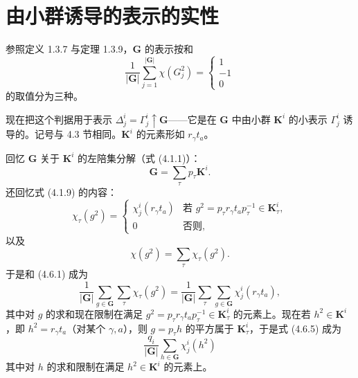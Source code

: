 \section{由小群诱导的表示的实性}

参照定义 1.3.7 与定理 1.3.9，$\mathbf{G}$ 的表示按和
\begin{equation*}
\frac{1}{|\mathbf{G}|}\sum^{|\mathbf{G}|}_{j=1}\chi(G^{2}_{j}) =
\left\{
\begin{array}{c}
1\\
-1\\
0
\end{array}
\right.
\tag{4.6.1}
\end{equation*}
的取值分为三种。

现在把这个判据用于表示 $\Delta^{i}_{j} = \Gamma^{i}_{j} \uparrow \mathbf{G}$——它是在 $\mathbf{G}$ 中由小群 $\mathbf{K}^{i}$ 的小表示 $\Gamma^{i}_{j}$ 诱导的。记号与 4.3 节相同。$\mathbf{K}^{i}$ 的元素形如 $r_{\gamma}t_{a}$。

回忆 $\mathbf{G}$ 关于 $\mathbf{K}^{i}$ 的左陪集分解（式 (4.1.1)）：
\begin{equation*}
\mathbf{G} = \sum_{\tau}p_{\tau}\mathbf{K}^{i}.
\tag{4.6.2}
\end{equation*}
还回忆式 (4.1.9) 的内容：
\begin{equation*}
\chi_{\tau}(g^{2}) =
\left\{
\begin{array}{ll}
\chi^{i}_{j}(r_{\gamma}t_{a}) & \text{若 } g^{2} = p_{\tau}r_{\gamma}t_{a}p^{-1}_{\tau} \in \mathbf{K}^{i}_{\tau},\\
0 & \text{否则},
\end{array}
\right.
\tag{4.6.3}
\end{equation*}
以及
\begin{equation*}
\chi(g^{2}) = \sum_{\tau}\chi_{\tau}(g^{2}).
\tag{4.6.4}
\end{equation*}
于是和 (4.6.1) 成为
\begin{equation*}
\frac{1}{|\mathbf{G}|}\sum_{g \in \mathbf{G}}\sum_{\tau}\chi_{\tau}(g^{2}) = \frac{1}{|\mathbf{G}|}\sum_{\tau}\sum_{g \in \mathbf{G}}\chi^{i}_{j}(r_{\gamma}t_{a}),
\tag{4.6.5}
\end{equation*}
其中对 $g$ 的求和现在限制在满足 $g^{2} = p_{\tau}r_{\gamma}t_{a}p^{-1}_{\tau} \in \mathbf{K}^{i}_{\tau}$ 的元素上。现在若 $h^{2} \in \mathbf{K}^{i}$，即 $h^{2} = r_{\gamma}t_{a}$（对某个 $\gamma, a$），则 $g = p_{\tau}h$ 的平方属于 $\mathbf{K}^{i}_{\tau}$，于是式 (4.6.5) 成为
\begin{equation*}
\frac{q_{i}}{|\mathbf{G}|}\sum_{h \in \mathbf{G}}\chi^{i}_{j}(h^{2})
\tag{4.6.6}
\end{equation*}
其中对 $h$ 的求和限制在满足 $h^{2} \in \mathbf{K}^{i}$ 的元素上。

